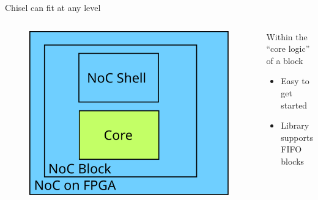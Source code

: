 \documentclass{beamer}
\begin{document}
\begin{frame}{Chisel can fit at any level}
\begin{columns}
  \begin{column}{0.4\textwidth}
    \begin{figure}
      \centering
      \includegraphics[width=\textwidth]{figs/chisel_2.svg}
    \end{figure}
  \end{column}
  \begin{column}{0.6\textwidth}
    Within the ``core logic'' of a block
    \begin{itemize}
      \item Easy to get started
      \item Library supports FIFO blocks
    \end{itemize}
  \end{column}
\end{columns}
\end{frame}
\end{document}
